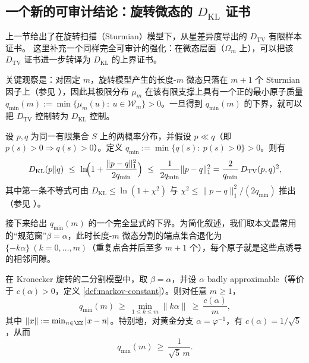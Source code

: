 

\subsection{一个新的可审计结论：旋转微态的 \texorpdfstring{$D_{\mathrm{KL}}$}{KL} 证书}

上一节给出了在旋转扫描（Sturmian）模型下，从星差异度导出的 \(D_{\mathrm{TV}}\) 有限样本证书。
这里补充一个同样完全可审计的强化：在微态层面（\(\Omega_m\) 上），可以把该 \(D_{\mathrm{TV}}\) 证书进一步转译为 \(D_{\mathrm{KL}}\) 的上界证书。

关键观察是：对固定 \(m\)，旋转模型产生的长度-\(m\) 微态只落在 \(m{+}1\) 个 Sturmian 因子上（参见 \cite{MorseHedlund1940,LindMarcus1995}），因此其极限分布 \(\mu_m\) 在该有限支撑上具有一个正的最小原子质量
\(
q_{\min}(m):=\min\{\mu_m(u):\ u\in\mathcal{W}_m\}>0
\)。一旦得到 \(q_{\min}(m)\) 的下界，就可以把 \(D_{\mathrm{TV}}\) 控制转为 \(D_{\mathrm{KL}}\) 控制。

\begin{lemma}[从 TV 到 KL：由最小原子下界给出的显式上界]\label{lem:kl-from-tv-qmin}
设 \(p,q\) 为同一有限集合 \(S\) 上的两概率分布，并假设 \(p\ll q\)（即 \(p(s)>0\Rightarrow q(s)>0\)）。定义
\(
q_{\min}:=\min\{q(s):\ p(s)>0\}>0
\)。则有
\[
D_{\mathrm{KL}}(p\|q)\ \le\ \ln\!\Bigl(1+\frac{\|p-q\|_1^2}{2q_{\min}}\Bigr)
\ \le\ \frac{1}{2q_{\min}}\|p-q\|_1^2
=\frac{2}{q_{\min}}\,D_{\mathrm{TV}}(p,q)^2,
\]
其中第一条不等式可由 \(D_{\mathrm{KL}}\le \ln(1+\chi^2)\) 与 \(\chi^2\le \|p-q\|_1^2/(2q_{\min})\) 推出（参见 \cite{SasonVerdu2016fDivergence}）。
\end{lemma}

接下来给出 \(q_{\min}(m)\) 的一个完全显式的下界。为简化叙述，我们取本文最常用的“规范窗”\(\beta=\alpha\)，此时长度-\(m\) 微态分割的端点集合退化为 \(\{ -k\alpha\}\ (k=0,\dots,m)\)（重复点合并后至多 \(m{+}1\) 个），每个原子就是这些点诱导的相邻间隙。

\begin{proposition}\label{prop:qmin-lowerbound-markov}
在 Kronecker 旋转的二分割模型中，取 \(\beta=\alpha\)，并设 \(\alpha\) badly approximable（等价于 \(c(\alpha)>0\)，定义 \ref{def:markov-constant}）。则对任意 \(m\ge 1\)，
\[
q_{\min}(m)\ \ge\ \min_{1\le k\le m}\|k\alpha\|\ \ge\ \frac{c(\alpha)}{m},
\]
其中 \(\|x\|:=\min_{n\in\ZZ}|x-n|\)。特别地，对黄金分支 \(\alpha=\varphi^{-1}\)，有 \(c(\alpha)=1/\sqrt5\)，从而
\[
q_{\min}(m)\ \ge\ \frac{1}{\sqrt5\,m}.
\]
\end{proposition}

